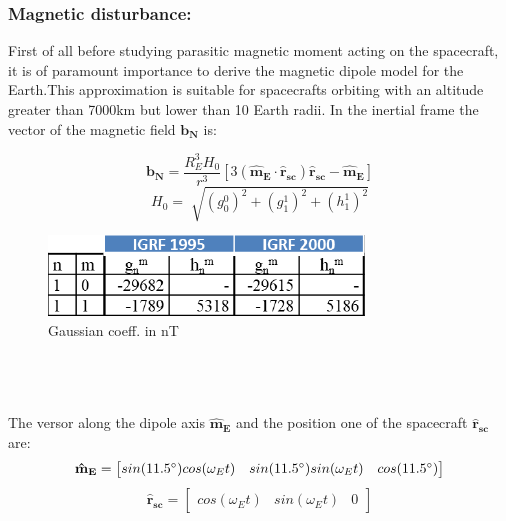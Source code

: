 \documentclass[11pt]{article}
\begin{document}
\subsubsection{Magnetic disturbance:}
First of all before studying parasitic magnetic moment acting on the spacecraft, it is of paramount importance to derive the magnetic dipole  model for the Earth.This approximation is suitable for spacecrafts orbiting with an altitude greater than 7000km but lower than 10 Earth radii. In the inertial frame the vector of the  magnetic field $ \mathbf{b_N}$ is:\\
\begin{minipage}{.36\textwidth}
\begin{equation}
\mathbf{b_N}=\displaystyle\frac{R_E^3H_0}{r^3}[3({\mathbf{\hat{m}_E} }\cdot \mathbf{\hat{r}_{sc}}){\mathbf{\hat{r}_{sc}}}-{\mathbf{\hat{m}_E}}]
\end{equation}
\begin{equation}
H_0=\sqrt[]{(g_0^0)^2+(g_1^1)^2+(h_1^1)^2}
\end{equation}

\end{minipage}
\begin{minipage}{.64\textwidth}
\begin{figure} [H]
\centering 
\includegraphics[scale=0.9]{coefficients.PNG}
\caption{ Gaussian coeff. in nT
\cite{coefficients}}
\end{figure}
\end{minipage}\\\\\\
 The versor along the dipole axis ${\mathbf{\hat{m}_E}}$ and the position one of the spacecraft ${\mathbf{\hat{r}_{sc}}}$  are:
\begin{equation}
\mathbf{\hat{m}_E}=\begin{bmatrix}sin(11.5 \degree)cos(\omega_Et)& sin(11.5 \degree)sin(\omega_Et) &cos(11.5 \degree)
\end{bmatrix}
\end{equation}
\begin{equation}
\mathbf{\hat{r}_{sc}}=\begin{bmatrix}
cos(\omega_Et) &sin(\omega_Et) &0
\end{bmatrix}
\end{equation}
\end{document}
